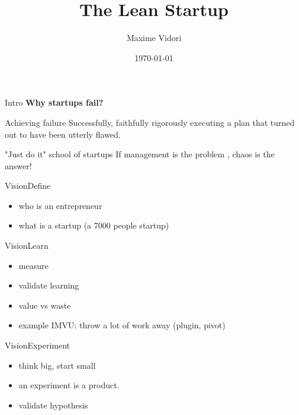 \documentclass[aspectratio=169]{beamer}
\title{The Lean Startup}
\date{\today}
\author{Maxime Vidori}
\begin{document}
\begin{frame}
  \titlepage
\end{frame}

\begin{frame}{Intro}
  \pause
  \LARGE \textbf{Why startups fail?} \normalsize \\
  \pause
\begin{block}{Achieving failure}
    Successfully, faithfully rigorously executing a plan that turned out to have
     been utterly flawed.
  \end{block}
  \pause
  \begin{block}{"Just do it" school of startups}
    If management is the problem , chaos is the answer!
  \end{block}


\end{frame}


\begin{frame}{Vision}{Define}
  \begin{itemize}
    \item who is an entrepreneur
    \item what is a startup (a 7000 people startup)
  \end{itemize}
\end{frame}

\begin{frame}{Vision}{Learn}
  \begin{itemize}
    \item measure
    \item validate learning
    \item value vs waste
    \item example IMVU: throw a lot of work away (plugin, pivot)
  \end{itemize}
\end{frame}

\begin{frame}{Vision}{Experiment}
  \begin{itemize}
      \item think big, start small
      \item an experiment is a product.
      \item validate hypothesis
  \end{itemize}
\end{frame}
\end{document}
